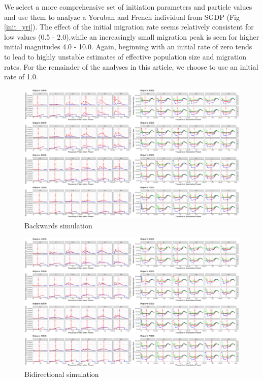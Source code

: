 \documentclass{article}
\begin{document}
We select a more comprehensive set of initiation parameters and particle values and use them to analyze a Yoruban and French individual from SGDP (Fig \ref{init_yri}). The effect of the initial migration rate seems relatively consistent for low values (0.5 - 2.0),while an increasingly small migration peak is seen for higher initial magnitudes 4.0 - 10.0. Again, beginning with an initial rate of zero tends to lead to highly unstable estimates of effective population size and migration rates. For the remainder of the analyses in this article, we choose to use an initial rate of 1.0. 


\begin{figure}
	\centering
	\includegraphics[width=\textwidth]{../plot/sims/backward_different_starts.pdf}
	\caption{Backwards simulation}
	\label{fig:backsim}
\end{figure}


\begin{figure}
	\centering
	\includegraphics[width=\textwidth]{../plot/sims/bidirectional_different_starts.pdf}
	\caption{Bidirectional simulation}
	\label{fig:bisim}
\end{figure}
\end{document}
